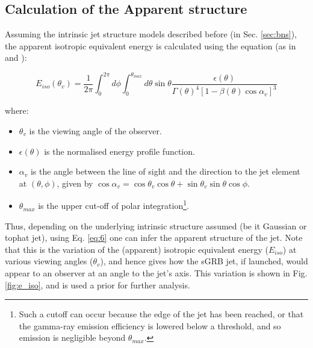     \subsection{Calculation of the Apparent structure}

    Assuming the intrinsic jet structure models described before (in Sec.
    \ref{sec:bns}), the apparent isotropic equivalent energy is calculated using the
    equation (as in \cite{salafia_2015} and
    \cite{biscoveanu_2020}):

     \begin{equation}
         \label{eq:6}
         E_{iso}(\theta_v) =
             \dfrac{1}{2\pi}
             \int_{0}^{2\pi} d\phi \int_{0}^{\theta_{max}} d\theta
             \sin \theta
             \dfrac{\epsilon(\theta)}{\Gamma(\theta)^4
             [1 - \beta(\theta) \cos \alpha_v]^3}
     \end{equation}

    where:
    \begin{itemize}

        \item $\theta_v$ is the viewing angle of the observer.

        \item $\epsilon(\theta)$ is the normalised energy profile function.

        \item $\alpha_v$ is the angle between the line of sight and the direction to the
            jet element at $(\theta, \phi)$, given by $\cos \alpha_v = \cos \theta_v
            \cos \theta + \sin \theta_v \sin \theta \cos \phi$.

        \item $\theta_{max}$ is the upper cut-off of polar integration\footnote{
                Such a cutoff can occur because the edge of the jet has been reached, or
                that the gamma-ray emission efficiency is lowered below a threshold, and
                so emission is negligible beyond $\theta_{max}$.
            }.

    \end{itemize}

    Thus, depending on the underlying intrinsic structure assumed (be it Gaussian or
    tophat jet), using Eq. \ref{eq:6} one can infer the apparent structure of the jet.
    Note that this is the variation of the (apparent) isotropic equivalent energy
    ($E_{iso}$) at various viewing angles ($\theta_v$), and hence gives how the sGRB
    jet, if launched, would appear to an observer at an angle to the jet's axis. This
    variation is shown in Fig. \ref{fig:e_iso}, and is used a prior for further
    analysis.

